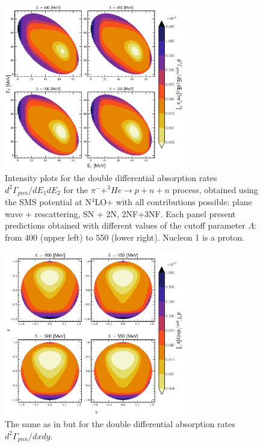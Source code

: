         \begin{figure}[h]
            \begin{center}
            \includegraphics[width=0.7\textwidth]{PlotData/PION/Dalitz_maps/figures/Dalitz_map_pnn_E1E2_cutofs.pdf}
            \end{center}
            \caption{Intensity plots for the double differential absorption rates
            $d^2 \Gamma_{pnn}/dE_1dE_2$ for the $\pi^- + ^3He \rightarrow p + n + n$
            process, obtained using the SMS potential at N$^4$LO+
            with all contributions possible: plane wave + rescattering, SN + 2N, 2NF+3NF.
            Each panel present predictions obtained with different values of the cutoff parameter $\Lambda$:
            from \SI{400}{\mev} (upper left) to \SI{550}{\mev} (lower right). Nucleon 1 is a proton.}
            \label{pion_map_E1E2_cutoff}
        \end{figure}

    \begin{figure}[h]
        \begin{center}
        \includegraphics[width=0.7\textwidth]{PlotData/PION/Dalitz_maps/figures/Dalitz_map_pnn_xy_cutofs.pdf}
        \end{center}
        \caption{The same as in  but for the double differential absorption rates
        $d^2 \Gamma_{pnn}/dxdy$.}
        \label{pion_map_xy_cutoff}
    \end{figure}

